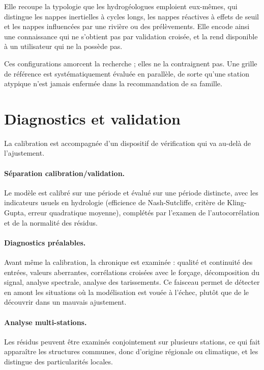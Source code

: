 Elle recoupe la typologie que les hydrogéologues emploient eux-mêmes, qui distingue les nappes
inertielles à cycles longs, les nappes réactives à effets de seuil et les nappes influencées par
une rivière ou des prélèvements. Elle encode ainsi une connaissance qui ne s'obtient pas par
validation croisée, et la rend disponible à un utilisateur qui ne la possède pas.

Ces configurations amorcent la recherche ; elles ne la contraignent pas. Une grille de référence
est systématiquement évaluée en parallèle, de sorte qu'une station atypique n'est jamais
enfermée dans la recommandation de sa famille.

\section{Diagnostics et validation}

La calibration est accompagnée d'un dispositif de vérification qui va au-delà de l'ajustement.

\paragraph{Séparation calibration/validation.} Le modèle est calibré sur une période et évalué
sur une période distincte, avec les indicateurs usuels en hydrologie (efficience de
Nash-Sutcliffe, critère de Kling-Gupta, erreur quadratique moyenne), complétés par l'examen de
l'autocorrélation et de la normalité des résidus.

\paragraph{Diagnostics préalables.} Avant même la calibration, la chronique est examinée :
qualité et continuité des entrées, valeurs aberrantes, corrélations croisées avec le forçage,
décomposition du signal, analyse spectrale, analyse des tarissements. Ce faisceau permet de
détecter en amont les situations où la modélisation est vouée à l'échec, plutôt que de le
découvrir dans un mauvais ajustement.

\paragraph{Analyse multi-stations.} Les résidus peuvent être examinés conjointement sur
plusieurs stations, ce qui fait apparaître les structures communes, donc d'origine régionale ou
climatique, et les distingue des particularités locales.

